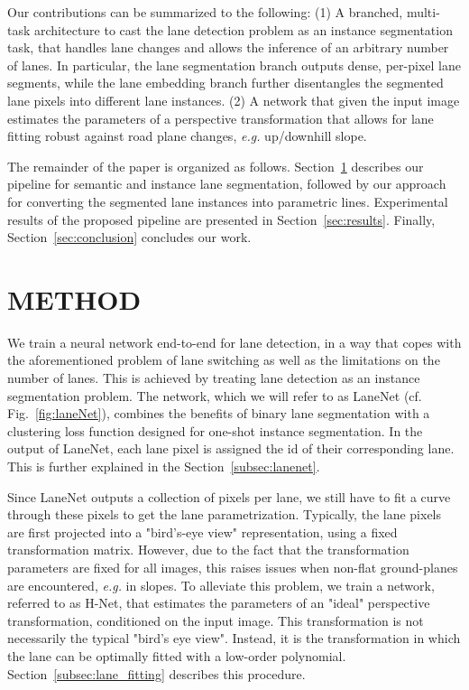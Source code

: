\documentclass[letterpaper, 10 pt, conference]{ieeeconf}
\newcommand{\eg}{\textit{e.g. }}
\begin{document}
Our contributions can be summarized to the following:
(1) A branched, multi-task architecture to cast the lane detection problem as an instance segmentation task, that handles lane changes and allows the inference of an arbitrary number of lanes. 
In particular, the
lane segmentation branch outputs dense, per-pixel lane segments, while the lane embedding branch further disentangles the segmented lane pixels into different lane instances.
(2) A network that given the input image estimates the parameters of a perspective transformation that allows for lane fitting robust against road plane changes, \eg up/downhill slope.

The remainder of the paper is organized as follows.
Section~\ref{sec:approach} describes our pipeline for semantic and instance lane segmentation, followed by our approach for converting the segmented lane instances into parametric lines.
Experimental results of the proposed pipeline are presented in Section~\ref{sec:results}. 
Finally, Section~\ref{sec:conclusion} concludes our work. 


\section{METHOD}
\label{sec:approach}

We train a neural network end-to-end for lane detection, in a way that copes with the aforementioned problem of lane switching as well as the limitations on the number of lanes. This is achieved by treating lane detection as an instance segmentation problem. The network, which we will refer to as LaneNet (cf. Fig.~\ref{fig:laneNet}), combines the benefits of binary lane segmentation with a clustering loss function designed for one-shot instance segmentation. In the output of LaneNet, each lane pixel is assigned the id of their corresponding lane. This is further explained in the Section~\ref{subsec:lanenet}.

Since LaneNet outputs a collection of pixels per lane, we still have to fit a curve through these pixels to get the lane parametrization. Typically, the lane pixels are first projected into a "bird's-eye view" representation, using a fixed transformation matrix. However, due to the fact that the transformation parameters are fixed for all images, this raises issues when non-flat ground-planes are encountered, \eg in slopes. To alleviate this problem, we train a network, referred to as H-Net, that estimates the parameters of an "ideal" perspective transformation, conditioned on the input image. This transformation is not necessarily the typical "bird's eye view". Instead, it is the transformation in which the lane can be optimally fitted with a low-order polynomial. Section~\ref{subsec:lane_fitting} describes this procedure.
\end{document}
